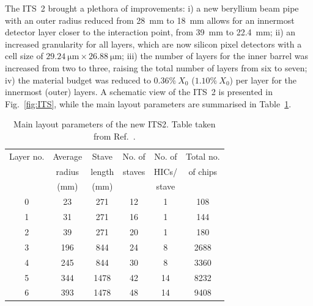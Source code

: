 The ITS~2 brought a plethora of improvements: i) a new beryllium beam pipe with an outer radius reduced from 28~mm to 18~mm allows for an innermost detector layer closer to the interaction point, from 39~mm to 22.4~mm; ii) an increased granularity for all layers, which are now silicon pixel detectors with a cell size of $\SI{29.24}{\micro\meter}\times\SI{26.88}{\micro\meter}$; iii) the number of layers for the inner barrel was increased from two to three, raising the total number of layers from six to seven; iv) the material budget was reduced to $0.36\%~X_0$ ($1.10\%~X_0$) per layer for the innermost (outer) layers. A schematic view of the ITS~2 is presented in Fig.~\ref{fig:ITS}, while the main layout parameters are summarised in Table~\ref{tab:ITS2_params}.

\begin{table}[htb]
    \centering
    \caption{Main layout parameters of the new ITS2. Table taken from Ref.~\cite{ALICE:2023udb}.}
    \begin{tabular}{c|ccccc}
    \toprule
    Layer no. &	Average&	Stave&	No. of &No. of &Total no.\\
    &	radius&length&staves&HICs/	&of chips\\
    &	(mm)&(mm)& &stave	&\\
    
    \midrule
    0	&23 & 271 & 12 & 1&108\\
    1	&31 & 271 & 16	& 1&144\\
    2	&39 & 271 & 20	& 1&180\\
    3	&196 & 844 & 24 & 8	&2688\\
    4	&245 & 844 & 30 & 8	& 3360\\
    5	&344 & 1478	&42 & 14 &	8232\\
    6	&393 & 1478	& 48 & 14 &	9408\\
    
    \bottomrule
    \end{tabular}
    \label{tab:ITS2_params}
\end{table}

